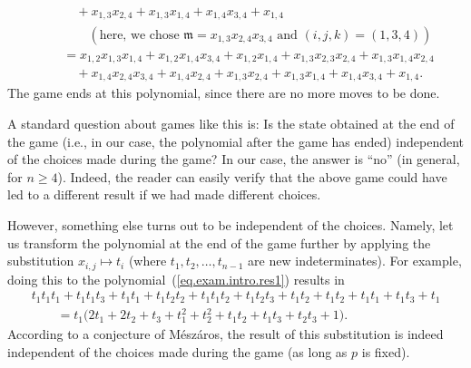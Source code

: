 \documentclass[pdftex]{sigma}
\numberwithin{equation}{section}
\begin{document}
\begin{Example}
\begin{gather}
\qquad\quad{} +x_{1,3}x_{2,4}+x_{1,3}x_{1,4}+x_{1,4}x_{3,4}+x_{1,4}\nonumber\\
\qquad\qquad ( \text{here, we chose }\mathfrak{m}=x_{1,3}x_{2,4}x_{3,4}\text{ and }(i,j,k) =( 1,3,4)) \nonumber\\
 \qquad{} =x_{1,2}x_{1,3}x_{1,4}+x_{1,2}x_{1,4}x_{3,4}+x_{1,2}x_{1,4}+x_{1,3}x_{2,3}x_{2,4}+x_{1,3}x_{1,4}x_{2,4}\nonumber\\
\qquad\quad{}+x_{1,4}x_{2,4}x_{3,4}+x_{1,4}x_{2,4}+x_{1,3}x_{2,4}+x_{1,3}x_{1,4}+x_{1,4}x_{3,4}+x_{1,4}. \label{eq.exam.intro.res1}
\end{gather}
The game ends at this polynomial, since there are no more moves to be done.

A standard question about games like this is: Is the state obtained at the end of the game (i.e., in our case, the polynomial after the game has ended) independent of the choices made during the game? In our case, the answer is ``no'' (in general, for $n\geq4$). Indeed, the reader can easily verify that the above game could have led to a different result if we had made different choices.

However, something else turns out to be independent of the choices. Namely, let us transform the polynomial at the end of the game further by applying the substitution $x_{i,j}\mapsto t_{i}$ (where $t_{1},t_{2},\ldots,t_{n-1}$ are new indeterminates). For example, doing this to the polynomial~(\ref{eq.exam.intro.res1}) results in%
\begin{gather*}
 t_{1}t_{1}t_{1}+t_{1}t_{1}t_{3}+t_{1}t_{1}+t_{1}t_{2}t_{2}+t_{1}t_{1} t_{2}+t_{1}t_{2}t_{3}+t_{1}t_{2}+t_{1}t_{2}+t_{1}t_{1}+t_{1}t_{3}+t_{1}\\
\qquad{} =t_{1}\big( 2t_{1}+2t_{2}+t_{3}+t_{1}^{2}+t_{2}^{2}+t_{1}t_{2}+t_{1}t_{3}+t_{2}t_{3}+1\big) .
\end{gather*}
According to a conjecture of M\'{e}sz\'{a}ros, the result of this substitution is indeed independent of the choices made during the game (as long as $p$ is fixed).
\end{Example}
\end{document}
